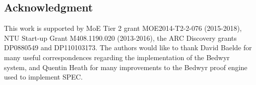 \documentclass{article}
\newcommand\obj[1]{\texttt{#1}}
\begin{document}


\subsection*{Acknowledgment}
This work is supported by MoE Tier 2 grant MOE2014-T2-2-076 (2015-2018),
NTU Start-up Grant M408.1190.020 (2013-2016), the ARC Discovery grants DP0880549 and DP110103173.
The authors would like to thank David Baelde for many useful correspondences 
regarding the implementation of the Bedwyr system, and Quentin Heath for 
many improvements to the Bedwyr proof engine used to implement SPEC.


\end{document}
